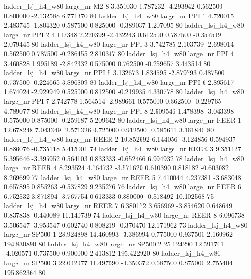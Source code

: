   ladder_lsj_h4_w80   large_nr       M2                 8  3.351030  1.787232  -4.293942 0.562500 0.800000 -2.132588    6.771370 80
  ladder_lsj_h4_w80   large_nr      PPI                 1  4.720015  2.483745  -1.804320 0.587500 0.825000 -0.389037    1.207095 80
  ladder_lsj_h4_w80   large_nr      PPI                 2  4.117348  2.220399  -2.432243 0.612500 0.787500 -0.357519    2.079445 80
  ladder_lsj_h4_w80   large_nr      PPI                 3  3.742785  2.103739  -2.698014 0.562500 0.787500 -0.286455    2.810347 80
  ladder_lsj_h4_w80   large_nr      PPI                 4  3.460828  1.995189  -2.842332 0.575000 0.762500 -0.259657    3.443514 80
  ladder_lsj_h4_w80   large_nr      PPI                 5  3.132673  1.834695  -2.879793 0.487500 0.737500 -0.224665    3.896809 80
  ladder_lsj_h4_w80   large_nr      PPI                 6  2.895617  1.674024  -2.929949 0.525000 0.812500 -0.219935    4.330778 80
  ladder_lsj_h4_w80   large_nr      PPI                 7  2.742778  1.564514  -2.989661 0.575000 0.862500 -0.229765    4.789077 80
  ladder_lsj_h4_w80   large_nr      PPI                 8  2.609546  1.478398  -3.043398 0.575000 0.875000 -0.259187    5.209642 80
  ladder_lsj_h4_w80   large_nr     REER                 1 12.678248  7.043349  -2.571326 0.725000 0.912500 -0.585611    3.161840 80
  ladder_lsj_h4_w80   large_nr     REER                 2 10.852692  6.144056  -3.124856 0.594937 0.886076 -0.735118    5.415001 79
  ladder_lsj_h4_w80   large_nr     REER                 3  9.351127  5.395646  -3.395952 0.564103 0.833333 -0.652466    6.994932 78
  ladder_lsj_h4_w80   large_nr     REER                 4  8.293524  4.764732  -3.571620 0.610390 0.818182 -0.603082    8.269699 77
  ladder_lsj_h4_w80   large_nr     REER                 5  7.410044  4.237381  -3.683048 0.657895 0.855263 -0.537829    9.235276 76
  ladder_lsj_h4_w80   large_nr     REER                 6  6.752532  3.871894  -3.767754 0.613333 0.880000 -0.518492   10.102568 75
  ladder_lsj_h4_w80   large_nr     REER                 7  6.380172  3.656969  -3.864620 0.648649 0.837838 -0.440089   11.140739 74
  ladder_lsj_h4_w80   large_nr     REER                 8  6.096738  3.506547  -3.953547 0.602740 0.808219 -0.370470   12.171962 73
  ladder_lsj_h4_w80   large_nr    SP500                 1 28.924898 14.460993  -3.386994 0.775000 0.937500  2.160962  194.830890 80
  ladder_lsj_h4_w80   large_nr    SP500                 2 25.124290 12.591701  -4.020571 0.737500 0.900000  2.413812  195.422920 80
  ladder_lsj_h4_w80   large_nr    SP500                 3 22.042077 11.497590  -4.350372 0.687500 0.875000  2.755404  195.862364 80
